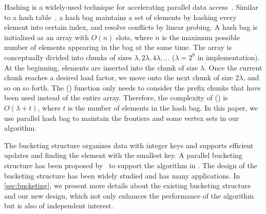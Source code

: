 Hashing is a widely-used technique for accelerating parallel data access~\cite{shun2014phase, Alcantara2009, dong2024parallel, ding2023efficient}.
Similar to a hash table~\cite{shun2014phase}, a hash bag maintains a set of elements by hashing
every element into certain index, and resolve conflicts by linear probing. 
A hash bag is initialized as an array with $O(n)$ slots, 
where $n$ is the maximum possible number of elements appearing in the bag at the same time. 
The array is conceptually divided into chunks of sizes $\lambda, 2\lambda, 4\lambda, ...$ ($\lambda=2^8$ in implementation).
At the beginning, elements are inserted into the chunk of size $\lambda$.
Once the current chunk reaches a desired load factor, 
we move onto the next chunk of size $2\lambda$, and so on so forth. 
The \bagpack{}() function only needs to consider the prefix chunks that have been used instead of the entire array.
Therefore, the complexity of \bagpack{}() is $O(\lambda+t)$, where $t$ is the number of elements in the hash bag.
In this paper, we use parallel hash bag to maintain the frontiers and some vertex sets in our algorithm. 

The bucketing structure organizes data with integer keys and supports efficient updates and finding the element with the smallest key. 
A parallel bucketing structure has been proposed by~\cite{dhulipala2017} to support the \kcore{} algorithm in \Julienne{}.
The design of the bucketing structure has been widely studied \cite{li2013parallel, shi2021parallel, shi2023theoretically,dhulipala2017,gbbs2021} and has many applications. 
In \cref{sec:bucketing}, we present more details about the existing bucketing structure and our new design, which not only enhances the performance of the \kcore algorithm but is also of independent interest.

